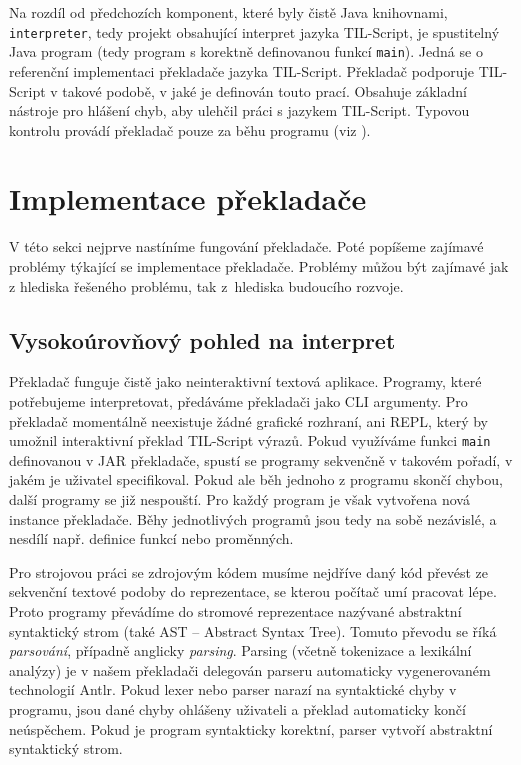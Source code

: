 Na rozdíl od předchozích komponent, které byly čistě Java knihovnami, \lstinline{interpreter}, tedy
projekt obsahující interpret jazyka TIL-Script, je spustitelný
Java program (tedy program s korektně definovanou funkcí \lstinline{main}). Jedná se o referenční
implementaci překladače jazyka TIL-Script. Překladač podporuje TIL-Script v takové podobě, v jaké je
definován touto prací. Obsahuje základní nástroje pro hlášení chyb, aby ulehčil práci
s jazykem TIL-Script. Typovou kontrolu provádí překladač pouze za běhu programu
(viz ).

\section{Implementace překladače}

V této sekci nejprve nastíníme fungování překladače. Poté popíšeme zajímavé problémy týkající se
implementace překladače. Problémy můžou být zajímavé jak z hlediska řešeného problému, tak
z~hlediska budoucího rozvoje.

\subsection{Vysokoúrovňový pohled na interpret}

Překladač funguje čistě jako neinteraktivní textová aplikace. Programy, které potřebujeme
interpretovat, předáváme překladači jako CLI argumenty. Pro překladač momentálně neexistuje žádné
grafické rozhraní, ani REPL, který by umožnil interaktivní překlad TIL-Script výrazů. Pokud
využíváme funkci \lstinline{main} definovanou v JAR překladače, spustí se programy sekvenčně
v takovém pořadí, v jakém je uživatel specifikoval. Pokud ale běh jednoho z programu skončí chybou,
další programy se již nespouští. Pro každý program je však vytvořena nová instance překladače. Běhy
jednotlivých programů jsou tedy na sobě nezávislé, a nesdílí např. definice funkcí nebo proměnných.

Pro strojovou práci se zdrojovým kódem musíme nejdříve daný kód převést ze sekvenční textové podoby
do reprezentace, se kterou počítač umí pracovat lépe. Proto programy převádíme do stromové
reprezentace nazývané abstraktní syntaktický strom
(také AST -- Abstract Syntax Tree)\cite{benes-compilers}. Tomuto převodu se říká \textit{parsování},
případně anglicky \textit{parsing}. Parsing (včetně tokenizace a
lexikální analýzy) je v našem překladači delegován parseru automaticky vygenerovaném technologií
Antlr. Pokud lexer nebo parser narazí na syntaktické chyby v programu, jsou dané chyby ohlášeny
uživateli a překlad automaticky končí neúspěchem. Pokud je program syntakticky korektní,
parser vytvoří abstraktní syntaktický strom.

